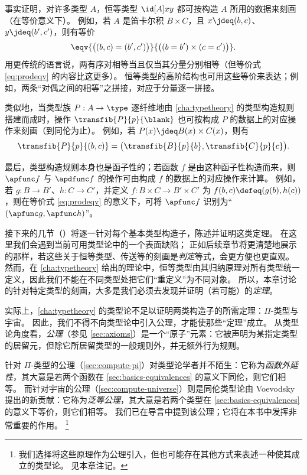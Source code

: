 事实证明，对许多类型 $A$，恒等类型 $\id[A]xy$ 都可按构造 $A$ 所用的数据来刻画（在等价意义下）。
例如，若 $A$ 是笛卡尔积 $B\times C$，且 $x\jdeq (b,c)$、$y\jdeq(b',c')$，则有等价
\begin{equation}\label{eq:prodeqv}
  \eqv{\big((b,c)=(b',c')\big)}{\big((b=b')\times (c=c')\big)}.
\end{equation}
用更传统的语言说，两有序对相等当且仅当其分量分别相等（但等价式 \eqref{eq:prodeqv} 的内容比这更多）。
恒等类型的高阶结构也可用这些等价来表达；例如，两条“对偶之间的相等”之拼接，对应于分量逐一拼接。

类似地，当类型族 $P:A\to\type$ 逐纤维地由 \cref{cha:typetheory} 的类型构造规则搭建而成时，操作 $\transfib{P}{p}{\blank}$ 也可按构成 $P$ 的数据上的对应操作来刻画（到同伦为止）。
例如，若 $P(x) \jdeq B(x)\times C(x)$，则有
\[\transfib{P}{p}{(b,c)} = \big(\transfib{B}{p}{b},\transfib{C}{p}{c}\big).\]

最后，类型构造规则本身也是函子性的；若函数 $f$ 是由这种函子性构造而来，则 $\apfunc f$ 与 $\apdfunc f$ 的操作可由构成 $f$ 的数据上的对应操作来计算。
例如，若 $g:B\to B'$、$h:C\to C'$，并定义 $f:B\times C \to B'\times C'$ 为 $f(b,c)\defeq (g(b),h(c))$，则在等价式 \eqref{eq:prodeqv} 的意义下，可将 $\apfunc f$ 识别为“$(\apfunc g,\apfunc h)$”。

接下来的几节（）将逐一针对每个基本类型构造子，陈述并证明这类定理。
在这里我们会遇到当前可用类型论中的一个表面缺陷；
正如后续章节将更清楚地展示的那样，若这些关于恒等类型、传送等的刻画是\emph{判定}等式，会更方便也更直观。
然而，在 \cref{cha:typetheory} 给出的理论中，恒等类型由其归纳原理对所有类型统一定义，因此我们不能在不同类型处把它们“重定义”为不同对象。
所以，本章讨论的针对特定类型的刻画，大多是我们必须去发现并证明（若可能）的\emph{定理}。

实际上，\cref{cha:typetheory} 的类型论不足以证明两类构造子的所需定理：$\Pi$-类型与宇宙。
因此，我们不得不向类型论中引入公理，才能使那些“定理”成立。
从类型论角度看，\emph{公理}（参见 \cref{sec:axioms}）是一个“原子”元素：它被声明为某指定类型的居留元，但除它所居留类型的一般规则外，并无额外行为规则。
%

%
%
针对 $\Pi$-类型的公理（\cref{sec:compute-pi}）对类型论学者并不陌生：它称为\emph{函数外延性}，其大意是若两个函数在 \cref{sec:basics-equivalences} 的意义下同伦，则它们相等。
而针对宇宙的公理（\cref{sec:compute-universe}）则是同伦类型论由 Voevodsky 提出的新贡献：它称为\emph{泛等公理}，其大意是若两个类型在 \cref{sec:basics-equivalences} 的意义下等价，则它们相等。
我们已在导言中提到该公理；它将在本书中发挥非常重要的作用。%
\footnote{我们选择将这些原理作为公理引入，但也可能存在其他方式来表述一种使其成立的类型论。
  见本章注记。}

